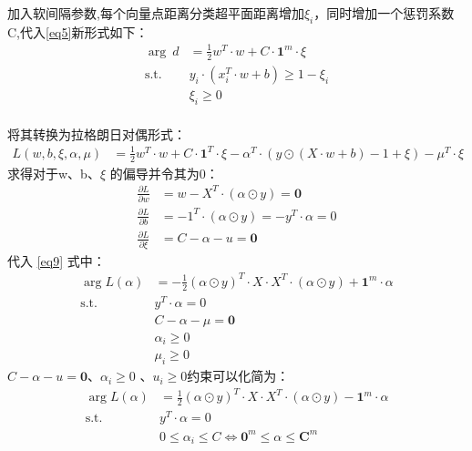 \documentclass[12pt, a4paper, oneside]{ctexart}
\begin{document}
加入软间隔参数,每个向量点距离分类超平面距离增加$\xi_i$，同时增加一个惩罚系数C,代入\eqref{eq5}新形式如下：
\begin{align*}
    \mathop{\arg\min_{w}}  \ d &=  \frac{1}{2}w^T \cdot w + C \cdot \boldsymbol{1}^m \cdot \xi\\
    \mathrm{ s.t. }\ \   & y_i \cdot (x_i^T \cdot w + b) \geq 1	- \xi_i			\\
    & \xi_i	\geq 0		\\
\end{align*}


将其转换为拉格朗日对偶形式：
\begin{align}
    L(w, b, \xi, {\alpha}, \mu ) &= \frac{1}{2}w^T \cdot w + C \cdot {\boldsymbol{1}^T} \cdot \xi  - {\alpha} ^T \cdot  (y \odot (X \cdot w + b) - 1 + \xi) - \mu^T \cdot \xi  \label{eq9} 
\end{align}
求得对于w、b、$\xi$ 的偏导并令其为0：
\begin{align}
    \frac{\partial L}{\partial w} &= w - X^T\cdot(\alpha \odot y) = \boldsymbol{0} \nonumber \\
    \frac{\partial L}{\partial b} &= - 1^T\cdot(\alpha \odot y) = - y^T \cdot \alpha = 0  \nonumber \\
    \frac{\partial L}{\partial \xi} &= C - \alpha - u  = \boldsymbol{0} \nonumber 
\end{align}
代入 \eqref{eq9} 式中： 
\begin{align}
    \mathop{\arg\max_{\alpha}}  L({\alpha}) &= -\frac{1}{2}(\alpha \odot y)^T \cdot X \cdot X^T \cdot (\alpha \odot y) + \boldsymbol{1}^m \cdot \alpha \nonumber \\
    \mathrm{ s.t. }\ \   &y^T \cdot \alpha = 0 \nonumber \\
    &C - \alpha - \mu \nonumber  = \boldsymbol{0} \nonumber \\
    &\alpha_i \geq 0 \nonumber \\
    &\mu_i \geq 0 \nonumber 
\end{align}
$C - \alpha - u   = \boldsymbol{0} $、$ \alpha_i \geq 0 $ 、$u_i \geq 0 $约束可以化简为：
\begin{align}
    \mathop{\arg\min_{\alpha}}  L({\alpha}) &= \frac{1}{2}(\alpha \odot y)^T \cdot X \cdot X^T \cdot (\alpha \odot y) - \boldsymbol{1}^m \cdot \alpha \label{eq10}\\
    \mathrm{ s.t. }\ \   &y^T \cdot \alpha = 0 \nonumber \\
    & 0 \leq \alpha_i  \leq C  \Leftrightarrow   \boldsymbol{0}^m \leq \alpha \leq \boldsymbol{C}^m \nonumber
\end{align}
\end{document}
